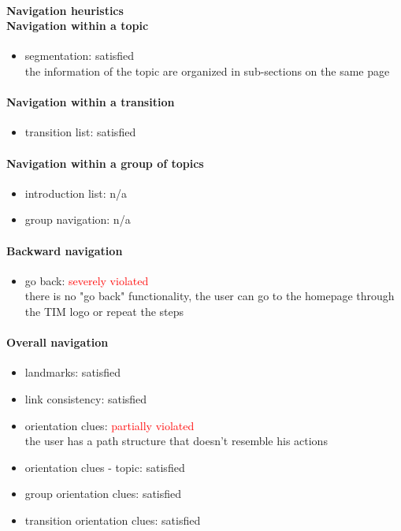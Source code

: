 \begin{enumerate}
	\paragraph*{Navigation heuristics \\ Navigation within a topic}
	\begin{itemize}
		\item segmentation: satisfied\\
		the information of the topic are organized in sub-sections on the same page 
	\end{itemize}	
	
	\paragraph*{Navigation within a transition}
	\begin{itemize}
		\item transition list: satisfied
	\end{itemize}
	
	\paragraph*{Navigation within a group of topics}
	\begin{itemize}
		\item introduction list: n/a
		\item group navigation: n/a
	\end{itemize}
	
	\paragraph*{Backward navigation}
	\begin{itemize}
		\item go back: \textcolor{red}{severely violated}\\
		there is no "go back" functionality, the user can go to the homepage through the TIM logo or repeat the steps
	\end{itemize}
	
	\paragraph*{Overall navigation}
	\begin{itemize}
		\item landmarks: satisfied
		\item link consistency: satisfied
		\item orientation clues: \textcolor{red}{partially violated}\\
		the user has a path structure that doesn't resemble his actions
		\item orientation clues - topic: satisfied
		\item group orientation clues: satisfied
		\item transition orientation clues: satisfied
	\end{itemize}	
	

\end{enumerate}
